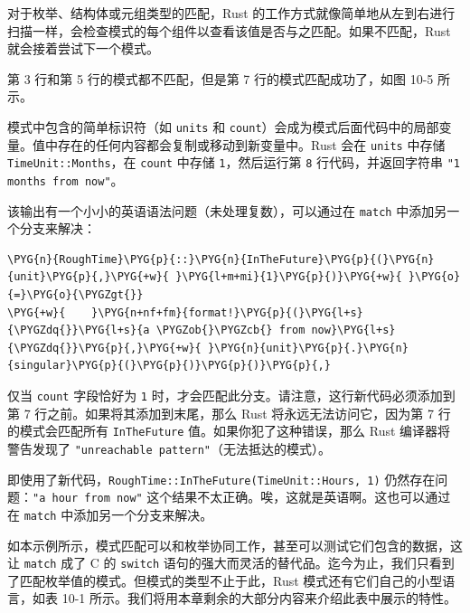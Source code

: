
对于枚举、结构体或元组类型的匹配，Rust 的工作方式就像简单地从左到右进行扫描一样，会检查模式的每个组件以查看该值是否与之匹配。如果不匹配，Rust 就会接着尝试下一个模式。

第 3 行和第 5 行的模式都不匹配，但是第 7 行的模式匹配成功了，如图 10-5 所示。


模式中包含的简单标识符（如 \texttt{units} 和 \texttt{count}）会成为模式后面代码中的局部变量。值中存在的任何内容都会复制或移动到新变量中。Rust 会在 \texttt{units} 中存储 \texttt{TimeUnit::Months}，在 \texttt{count} 中存储 \texttt{1}，然后运行第 \texttt{8} 行代码，并返回字符串 \texttt{"1 months from now"}。

该输出有一个小小的英语语法问题（未处理复数），可以通过在 \texttt{match} 中添加另一个分支来解决：

\begin{Verbatim}[commandchars=\\\{\},breaklines=true,breakanywhere=true,fontsize=\codefont,xleftmargin=17bp]
\PYG{n}{RoughTime}\PYG{p}{::}\PYG{n}{InTheFuture}\PYG{p}{(}\PYG{n}{unit}\PYG{p}{,}\PYG{+w}{ }\PYG{l+m+mi}{1}\PYG{p}{)}\PYG{+w}{ }\PYG{o}{=}\PYG{o}{\PYGZgt{}}
\PYG{+w}{    }\PYG{n+nf+fm}{format!}\PYG{p}{(}\PYG{l+s}{\PYGZdq{}}\PYG{l+s}{a \PYGZob{}\PYGZcb{} from now}\PYG{l+s}{\PYGZdq{}}\PYG{p}{,}\PYG{+w}{ }\PYG{n}{unit}\PYG{p}{.}\PYG{n}{singular}\PYG{p}{(}\PYG{p}{)}\PYG{p}{)}\PYG{p}{,}
\end{Verbatim}

仅当 \texttt{count} 字段恰好为 \texttt{1} 时，才会匹配此分支。请注意，这行新代码必须添加到第 7 行之前。如果将其添加到末尾，那么 Rust 将永远无法访问它，因为第 7 行的模式会匹配所有 \texttt{InTheFuture} 值。如果你犯了这种错误，那么 Rust 编译器将警告发现了 \texttt{"unreachable pattern"}（无法抵达的模式）。

即使用了新代码，\texttt{RoughTime::InTheFuture(TimeUnit::Hours, 1)} 仍然存在问题：\texttt{"a hour from now"} 这个结果不太正确。唉，这就是英语啊。这也可以通过在 \texttt{match} 中添加另一个分支来解决。

如本示例所示，模式匹配可以和枚举协同工作，甚至可以测试它们包含的数据，这让 \texttt{match} 成了 C 的 \texttt{switch} 语句的强大而灵活的替代品。迄今为止，我们只看到了匹配枚举值的模式。但模式的类型不止于此，Rust 模式还有它们自己的小型语言，如表 10-1 所示。我们将用本章剩余的大部分内容来介绍此表中展示的特性。

